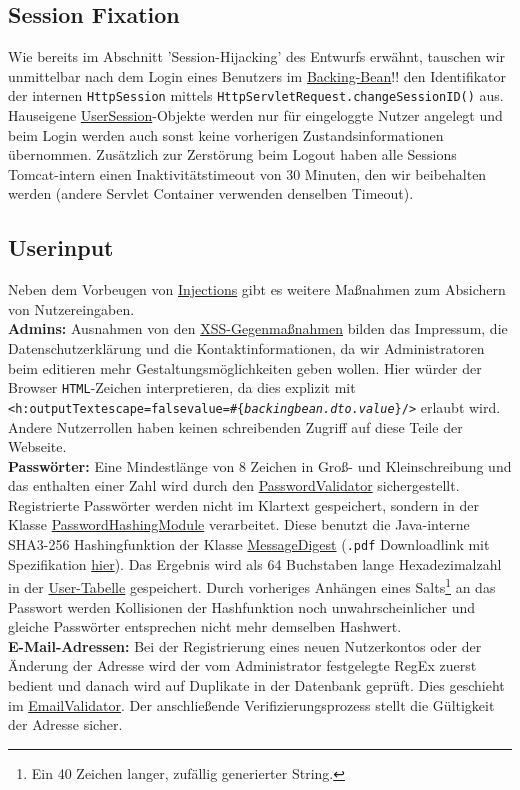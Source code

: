 \documentclass{article}
\begin{document}
\subsection{Session Fixation}
Wie bereits im Abschnitt 'Session-Hijacking' des Entwurfs erwähnt, tauschen wir unmittelbar nach dem Login eines Benutzers im \hyperlink{Login}{Backing-Bean}!! den Identifikator der internen \texttt{HttpSession} mittels \texttt{HttpServletRequest.changeSessionID()}  aus. Hauseigene \hyperlink{invalidaccess}{UserSession}-\hypertarget{safetyfirst}{Objekte} werden nur für eingeloggte Nutzer angelegt und beim Login werden auch sonst keine vorherigen Zustandsinformationen übernommen. Zusätzlich zur Zerstörung beim Logout haben alle Sessions Tomcat-intern einen Inaktivitätstimeout von 30 Minuten, den wir beibehalten werden (andere Servlet Container verwenden denselben Timeout).
\subsection{Userinput}
Neben dem Vorbeugen von \hyperlink{Injections}{Injections} gibt es weitere Maßnahmen zum Absichern von Nutzereingaben.\\
\textbf{Admins:} Ausnahmen von den \hyperlink{XSS}{XSS-Gegenmaßnahmen} bilden das Impressum, die Datenschutzerklärung und  die Kontaktinformationen, da wir Administratoren beim editieren mehr Gestaltungsmöglichkeiten geben wollen. Hier würder der Browser \texttt{HTML}-Zeichen interpretieren, da dies explizit mit \texttt{<h:outputText\hspace{2mm}escape=\dq false\dq\hspace{2mm}value=\dq\#\{\textit{backingbean.dto.value}\}\dq/>} erlaubt wird. Andere Nutzerrollen haben keinen schreibenden Zugriff auf diese Teile der Webseite.\\
\textbf{Passwörter:} Eine Mindestlänge von 8 Zeichen in Groß- und Kleinschreibung und das enthalten einer Zahl wird durch den \hyperlink{Validator}{PasswordValidator} sichergestellt. Registrierte Passwörter werden nicht im Klartext gespeichert, sondern in der Klasse \hyperlink{Hash}{PasswordHashingModule} verarbeitet. Diese benutzt die Java-interne SHA3-256 Hashingfunktion der Klasse \hyperlink{https://docs.oracle.com/javase/9/docs/api/java/security/MessageDigest.html}{MessageDigest} (\texttt{.pdf} Downloadlink mit Spezifikation \hyperlink{https://nvlpubs.nist.gov/nistpubs/FIPS/NIST.FIPS.202.pdf}{hier}). Das Ergebnis wird als 64 Buchstaben lange Hexadezimalzahl in der \hyperlink{User}{User-Tabelle} gespeichert. Durch vorheriges Anhängen eines Salts\footnote{Ein 40 Zeichen langer, zufällig generierter String.} an das Passwort werden Kollisionen der Hashfunktion noch unwahrscheinlicher und gleiche Passwörter entsprechen nicht mehr demselben Hashwert.\\
\textbf{E-Mail-Adressen:} Bei der Registrierung eines neuen Nutzerkontos oder der Änderung der Adresse wird der vom Administrator festgelegte RegEx zuerst bedient und danach wird auf Duplikate in der Datenbank geprüft. Dies geschieht im \hyperlink{Validator}{EmailValidator}. Der anschließende Verifizierungsprozess stellt die Gültigkeit der Adresse sicher.
\end{document}
